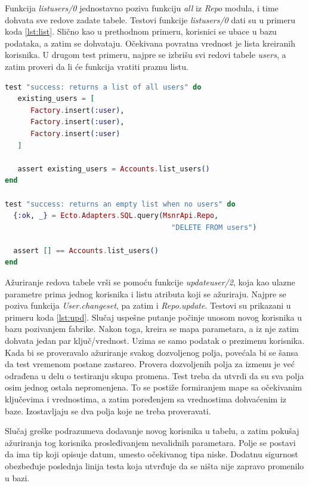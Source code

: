 \documentclass[12pt,oneside]{memoir}
\begin{document}
\par Funkcija \emph{list{\textunderscore}users/0} jednostavno poziva funkciju \emph{all} iz \emph{Repo} modula, i time dohvata sve redove zadate tabele. Testovi funkcije \emph{list{\textunderscore}users/0} dati su u primeru koda \ref{lst:list}. Slično kao u prethodnom primeru, korisnici se ubace u bazu podataka, a zatim se dohvataju. Očekivana povratna vrednost je lista kreiranih korisnika. U drugom test primeru, najpre se izbrišu svi redovi tabele \emph{users}, a zatim proveri da li će funkcija vratiti praznu listu. \\

\begin{minipage}{\linewidth}
\begin{lstlisting}[language=elixir, basicstyle=\small, caption={Testiranje funkcije \emph{list{\textunderscore}users/0}},captionpos=b, label={lst:list}]
test "success: returns a list of all users" do
   existing_users = [
      Factory.insert(:user),
      Factory.insert(:user),
      Factory.insert(:user)
   ]
      
   assert existing_users = Accounts.list_users()
end

test "success: returns an empty list when no users" do
  {:ok, _} = Ecto.Adapters.SQL.query(MsnrApi.Repo, 
  				                       "DELETE FROM users")

  assert [] == Accounts.list_users()
end
\end{lstlisting}
\end{minipage}

\par Ažuriranje redova tabele vrši se pomoću funkcije \emph{update{\textunderscore}user/2}, koja kao ulazne parametre prima jednog korisnika i listu atributa koji se ažuriraju. Najpre se poziva funkcija \emph{User.changeset}, pa zatim i \emph{Repo.update}. Testovi su prikazani u primeru koda \ref{lst:upd}. Slučaj uspešne putanje počinje unosom novog korisnika u bazu  pozivanjem fabrike. Nakon toga, kreira se mapa parametara, a iz nje zatim dohvata jedan par ključ/vrednost. Uzima se samo podatak o prezimenu korisnika. Kada bi se proveravalo ažuriranje svakog dozvoljenog polja, povećala bi se šansa da test vremenom postane zastareo. Provera dozvoljenih polja za izmenu je već odrađena u delu o testiranju skupa promena. Test treba da utvrdi da su sva polja osim jednog ostala nepromenjena. To se postiže formiranjem mape sa očekivanim ključevima i vrednostima, a zatim poređenjem sa vrednostima dohvaćenim iz baze. Izostavljaju se dva polja koje ne treba proveravati. 
\par Slučaj greške podrazumeva dodavanje novog korisnika u tabelu, a zatim pokušaj ažuriranja tog korisnika prosleđivanjem nevalidnih parametara. Polje se postavi da ima tip koji opisuje datum, umesto očekivanog tipa niske. Dodatnu sigurnost obezbeđuje poslednja linija testa koja utvrđuje da se ništa nije zapravo promenilo u bazi. \\
\end{document}
